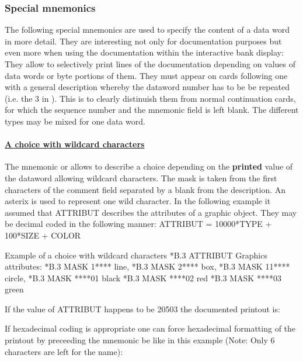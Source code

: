 \subsubsection*{Special mnemonics}
 
The following special mnemonics are used to specify the content of
a data word in more detail.
They are interesting not only for documentation
purposes but even more when using the documentation within the 
interactive bank display: They allow to selectively print lines of
the documentation depending on values of data words or byte portions
of them. They must appear on cards following one with a general 
description whereby the dataword number has to be be repeated 
(i.e. the 3 in ). This is to clearly distinuish them from 
normal continuation cards, for which the sequence number and the 
mnemonic field is left blank. The different types may be mixed for 
one data word.
 
\paragraph{\underline{\bf A choice with wildcard characters}}
 
The mnemonic  or  allows to describe a choice
depending on the {\bf printed} value of the dataword allowing
wildcard characters. The mask is taken from the first characters of
the comment field separated by a blank from the description.
An asterix is used to represent one wild character. 
In the following example it assumed that ATTRIBUT describes the
attributes of a graphic object. They may be decimal coded in the
following manner:  ATTRIBUT = 10000*TYPE + 100*SIZE + COLOR
 
\begin{XMPt}{Example of a choice with wildcard characters}
*B.3   ATTRIBUT  Graphics attributes: 
*B.3   MASK        1****  line,
*B.3   MASK        2****  box,
*B.3   MASK       11****  circle,
*B.3   MASK       ****01  black
*B.3   MASK       ****02  red
*B.3   MASK       ****03  green
\end{XMPt}
If the value of ATTRIBUT happens to be 20503 the documented
printout is:
 
 
If hexadecimal coding is appropriate one can force hexadecimal 
formatting of the printout by preceeding the mnemonic be 
like in this example (Note: Only 6 characters are left for the name):
 
